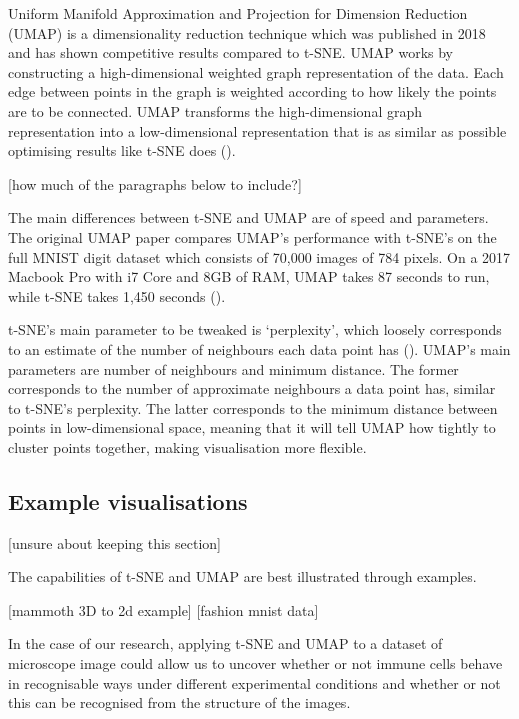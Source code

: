 Uniform Manifold Approximation and Projection for Dimension Reduction (UMAP) is a dimensionality reduction technique which was published in 2018 and has shown competitive results compared to t-SNE. UMAP works by constructing a high-dimensional weighted graph representation of the data. Each edge between points in the graph is weighted according to how likely the points are to be connected. UMAP transforms the high-dimensional graph representation into a low-dimensional representation that is as similar as possible optimising results like t-SNE does (\cite{https://pair-code.github.io/understanding-umap/}).

[how much of the paragraphs below to include?]

The main differences between t-SNE and UMAP are of speed and parameters. The original UMAP paper compares UMAP's performance with t-SNE's on the full MNIST digit dataset which consists of 70,000 images of 784 pixels. On a 2017 Macbook Pro with i7 Core and 8GB of RAM, UMAP takes 87 seconds to run, while t-SNE takes 1,450 seconds (\cite{https://arxiv.org/pdf/1802.03426.pdf}).

t-SNE's main parameter to be tweaked is `perplexity', which loosely corresponds to an estimate of the number of neighbours each data point has (\cite{https://distill.pub/2016/misread-tsne/}). UMAP's main parameters are number of neighbours and minimum distance. The former corresponds to the number of approximate neighbours a data point has, similar to t-SNE's perplexity. The latter corresponds to the minimum distance between points in low-dimensional space, meaning that it will tell UMAP how tightly to cluster points together, making visualisation more flexible.

\subsection{Example visualisations}

[unsure about keeping this section]

The capabilities of t-SNE and UMAP are best illustrated through examples.

[mammoth 3D to 2d example]
[fashion mnist data]

In the case of our research, applying t-SNE and UMAP to a dataset of microscope image could allow us to uncover whether or not immune cells behave in recognisable ways under different experimental conditions and whether or not this can be recognised from the structure of the images.

